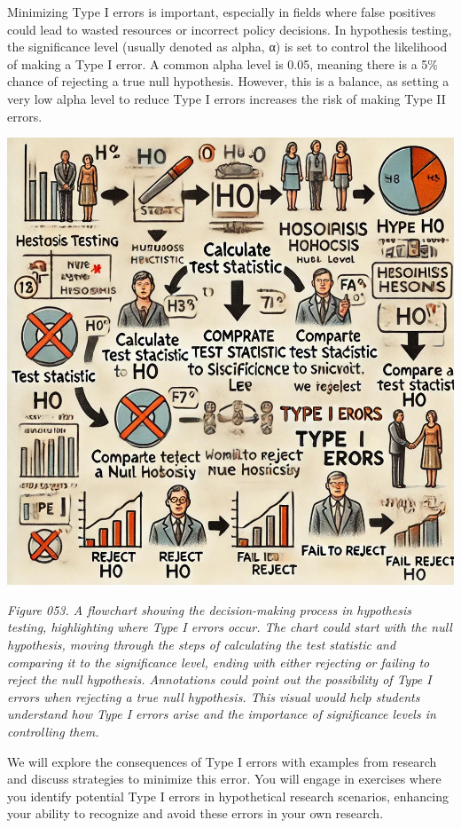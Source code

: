 \documentclass[
]{book}
\begin{document}
Minimizing Type I errors is important, especially in fields where false positives could lead to wasted resources or incorrect policy decisions. In hypothesis testing, the significance level (usually denoted as alpha, α) is set to control the likelihood of making a Type I error. A common alpha level is 0.05, meaning there is a 5\% chance of rejecting a true null hypothesis. However, this is a balance, as setting a very low alpha level to reduce Type I errors increases the risk of making Type II errors.

\includegraphics[width=1\textwidth,height=\textheight]{images/fig053.jpg}

\emph{Figure 053. A flowchart showing the decision-making process in hypothesis testing, highlighting where Type I errors occur. The chart could start with the null hypothesis, moving through the steps of calculating the test statistic and comparing it to the significance level, ending with either rejecting or failing to reject the null hypothesis. Annotations could point out the possibility of Type I errors when rejecting a true null hypothesis. This visual would help students understand how Type I errors arise and the importance of significance levels in controlling them.}

We will explore the consequences of Type I errors with examples from research and discuss strategies to minimize this error. You will engage in exercises where you identify potential Type I errors in hypothetical research scenarios, enhancing your ability to recognize and avoid these errors in your own research.
\end{document}
